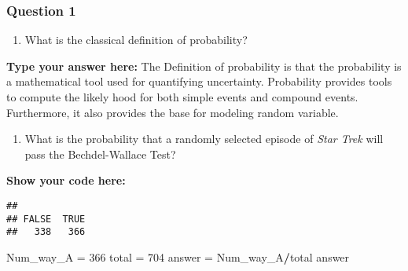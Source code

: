 \documentclass[
]{article}
\newenvironment{Shaded}{\begin{snugshade}}{\end{snugshade}}
\newcommand{\CommentTok}[1]{\textcolor[rgb]{0.56,0.35,0.01}{\textit{#1}}}
\newcommand{\DecValTok}[1]{\textcolor[rgb]{0.00,0.00,0.81}{#1}}
\newcommand{\KeywordTok}[1]{\textcolor[rgb]{0.13,0.29,0.53}{\textbf{#1}}}
\newcommand{\NormalTok}[1]{#1}
\newcommand{\OperatorTok}[1]{\textcolor[rgb]{0.81,0.36,0.00}{\textbf{#1}}}
\newcommand{\StringTok}[1]{\textcolor[rgb]{0.31,0.60,0.02}{#1}}
\providecommand{\tightlist}{%
  \setlength{\itemsep}{0pt}\setlength{\parskip}{0pt}}
\begin{document}
\hypertarget{question-1-1}{%
\subsubsection{Question 1}\label{question-1-1}}

\begin{enumerate}
\def\labelenumi{\alph{enumi}.}
\tightlist
\item
  What is the classical definition of probability?
\end{enumerate}

\textbf{Type your answer here:} The Definition of probability is that
the probability is a mathematical tool used for quantifying uncertainty.
Probability provides tools to compute the likely hood for both simple
events and compound events. Furthermore, it also provides the base for
modeling random variable.

\begin{enumerate}
\def\labelenumi{\alph{enumi}.}
\setcounter{enumi}{1}
\tightlist
\item
  What is the probability that a randomly selected episode of \emph{Star
  Trek} will pass the Bechdel-Wallace Test?
\end{enumerate}

\textbf{Show your code here:}

\begin{Shaded}
\end{Shaded}

\begin{verbatim}
## 
## FALSE  TRUE 
##   338   366
\end{verbatim}

\begin{Shaded}
\begin{Highlighting}[]
\NormalTok{Num_way_A =}\StringTok{ }\DecValTok{366}
\NormalTok{total =}\StringTok{ }\DecValTok{704}
\NormalTok{answer =}\StringTok{ }\NormalTok{Num_way_A}\OperatorTok{/}\NormalTok{total}
\NormalTok{answer}
\end{Highlighting}
\end{Shaded}
\end{document}
